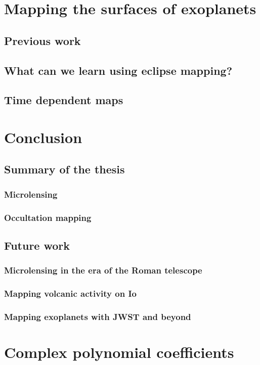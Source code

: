 \documentclass[12pt,dvipsnames]{report}
\begin{document}
\chapter{Mapping the surfaces of exoplanets}
\label{ch:mapping_exoplanets}
\section{Previous work}
\section{What can we learn using eclipse mapping?}
\section{Time dependent maps}

\chapter{Conclusion}
\section{Summary of the thesis}
\subsection{Microlensing}
\subsection{Occultation mapping}
\section{Future work}
\subsection{Microlensing in the era of the Roman telescope}
\subsection{Mapping volcanic activity on Io}
\subsection{Mapping exoplanets with JWST and beyond}

\appendix

\chapter{Complex polynomial coefficients}
\label{app:complex_poly}
\end{document}
